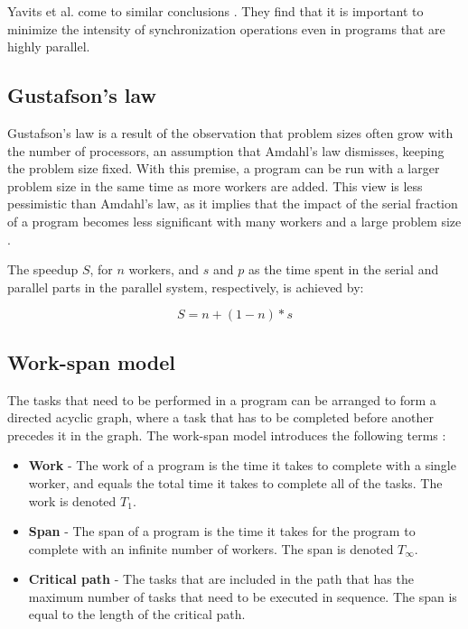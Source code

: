 Yavits et al. come to similar conclusions \cite{yavits_2014_effect_teocasoalims}. They find that it is important to minimize the
intensity of synchronization operations even in programs that are highly parallel.

\subsection{Gustafson's law}
Gustafson's law \cite{gustafson_1988_reevaluating_ral} is a result of the observation that problem sizes often grow with the
number of processors, an assumption that Amdahl's law dismisses, keeping the problem size fixed. With this premise, a program can
be run with a larger problem size in the same time as more workers are added. This view is less pessimistic than Amdahl's law, as
it implies that the impact of the serial fraction of a program becomes less significant with many workers and a large problem
size \cite[p. 61-62]{mccool_2012_structured_spppfec}.

The speedup $S$, for $n$ workers, and $s$ and $p$ as the time spent in the serial and parallel parts in the parallel system,
respectively, is achieved by:

\begin{displaymath}
  S = n + (1-n) * s
\end{displaymath}

\subsection{Work-span model} \label{work-span}
The tasks that need to be performed in a program can be arranged to form a directed acyclic graph, where a task that
has to be completed before another precedes it in the graph. The work-span model introduces the following terms
\cite[p. 62-65]{mccool_2012_structured_spppfec}:
\begin{itemize}
  \item \textbf{Work} - The work of a program is the time it takes to complete with a single worker, and equals the total time it
    takes to complete all of the tasks. The work is denoted $T_1$.
  \item \textbf{Span} - The span of a program is the time it takes for the program to complete with an infinite number of workers.
    The span is denoted $T_\infty$.
  \item \textbf{Critical path} - The tasks that are included in the path that has the maximum number of tasks that need
    to be executed in sequence. The span is equal to the length of the critical path.
\end{itemize}

